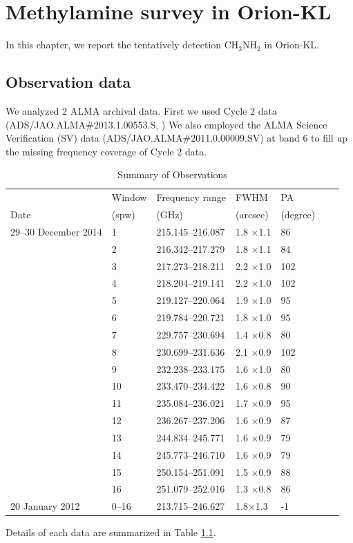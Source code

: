 \chapter{Methylamine survey in Orion-KL
\label{chap:Orion-KL}}

In this chapter, we report the tentatively detection CH$_{3}$NH$_{2}$ in Orion-KL.

\section{Observation data}
We analyzed 2 ALMA archival data. First we used Cycle 2 data (ADS/JAO.ALMA\#2013.1.00553.S, 
\cite{Pagani+2017}) 
We also employed the ALMA Science Verification (SV) data (ADS/JAO.ALMA\#2011.0.00009.SV) 
at band 6 to fill up the missing frequency coverage of Cycle 2 data. 
\renewcommand{\arraystretch}{1.5}
\begin{table}[htb]
\begin{center}
  \caption{Summary of Observations}
  \label{tab:Obs_Ori}
{\scriptsize
  \begin{tabular}{lllllll} \hline \hline
 & Window & Frequency range & FWHM & PA \\
Date & (spw)  & (GHz) & (arcsec) & (degree) \\ \hline 
29--30 December 2014&1 & 215.145--216.087 & 1.8 $\times$1.1 & 86 \\
&2 & 216.342--217.279 & 1.8 $\times$1.1 & 84 \\
&3 & 217.273--218.211 & 2.2 $\times$1.0 & 102 \\
&4 & 218.204--219.141 & 2.2 $\times$1.0 & 102 \\
&5 & 219.127--220.064 & 1.9 $\times$1.0 & 95 \\
&6 & 219.784--220.721 & 1.8 $\times$1.0  & 95 \\
&7 & 229.757--230.694 & 1.4 $\times$0.8 & 80 \\
&8 & 230.699--231.636 & 2.1 $\times$0.9 & 102 \\
&9 & 232.238--233.175 & 1.6 $\times$1.0 & 80 \\
&10 & 233.470--234.422 & 1.6 $\times$0.8 & 90 \\
&11 & 235.084--236.021 & 1.7 $\times$0.9 & 95 \\
&12 & 236.267--237.206 & 1.6 $\times$0.9 & 87 \\
&13 & 244.834--245.771 & 1.6 $\times$0.9 & 79 \\
&14 & 245.773--246.710 & 1.6 $\times$0.9 & 79 \\
&15 & 250.154--251.091 & 1.5 $\times$0.9 & 88 \\
&16 & 251.079--252.016 & 1.3 $\times$0.8 & 86 \\ \hline
20 January 2012 & 0--16 & 213.715--246.627& 1.8$\times$1.3 & -1  \\ \hline
  \end{tabular}
  }
\end{center}
\end{table}
Details of each data are summarized in Table \ref{tab:Obs_Ori}.

